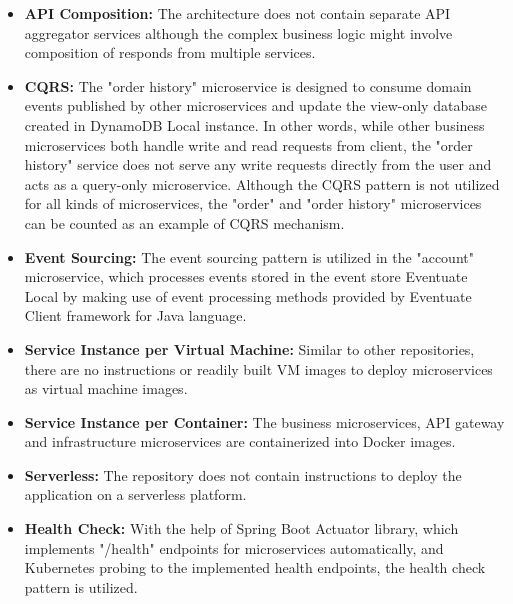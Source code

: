 \documentclass{Configuration_Files/PoliMi3i_thesis}
\begin{document}
\begin{itemize}
    \item \textbf{API Composition:} The architecture does not contain separate API aggregator services although the complex business logic might involve composition of responds from multiple services.
    
    \item \textbf{CQRS:} The "order history" microservice is designed to consume domain events published by other microservices and update the view-only database created in DynamoDB Local instance.
    In other words, while other business microservices both handle write and read requests from client, the "order history" service does not serve any write requests directly from the user and acts as a query-only microservice.
    Although the CQRS pattern is not utilized for all kinds of microservices, the "order" and "order history" microservices can be counted as an example of CQRS mechanism.
    
    \item \textbf{Event Sourcing:} The event sourcing pattern is utilized in the "account" microservice, which processes events stored in the event store Eventuate Local by making use of event processing methods provided by Eventuate Client\footnotemark[92] framework for Java language.
    
    \item \textbf{Service Instance per Virtual Machine:} Similar to other repositories, there are no instructions or readily built VM images to deploy microservices as virtual machine images.
    
    \item \textbf{Service Instance per Container:} The business microservices, API gateway and infrastructure microservices are containerized into Docker images.
    
    \item \textbf{Serverless:} The repository does not contain instructions to deploy the application on a serverless platform.
    
    \item \textbf{Health Check:} With the help of Spring Boot Actuator library, which implements "/health" endpoints for microservices automatically, and Kubernetes probing to the implemented health endpoints, the health check pattern is utilized.
    

\end{itemize}
\end{document}
